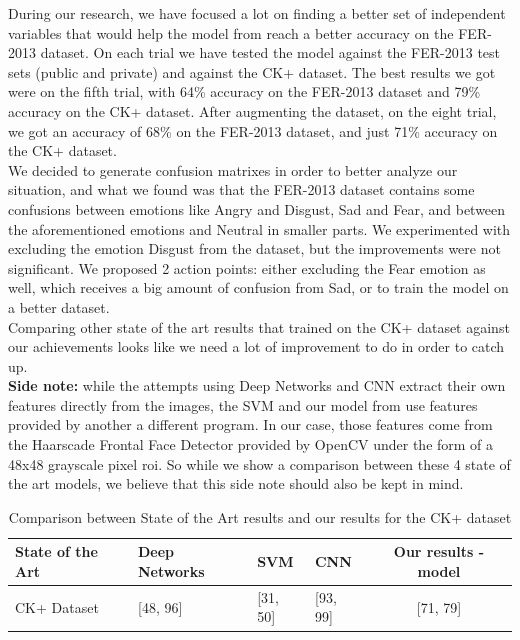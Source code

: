 \documentclass[runningheads,a4paper,11pt]{report}
\begin{document}
During our research, we have focused a lot on finding a better set of independent variables that would help the model from \cite{Arriaga17} reach a better accuracy on the FER-2013 dataset. On each trial we have tested the model against the FER-2013 test sets (public and private) and against the CK+ dataset. The best results we got were on the fifth trial, with 64\% accuracy on the FER-2013 dataset and 79\% accuracy on the CK+ dataset. After augmenting the dataset, on the eight trial, we got an accuracy of 68\% on the FER-2013 dataset, and just 71\% accuracy on the CK+ dataset. \\
We decided to generate confusion matrixes in order to better analyze our situation, and what we found was that the FER-2013 dataset contains some confusions between emotions like Angry and Disgust, Sad and Fear, and between the aforementioned emotions and Neutral in smaller parts. We experimented with excluding the emotion Disgust from the dataset, but the improvements were not significant. We proposed 2 action points: either excluding the Fear emotion as well, which receives a big amount of confusion from Sad, or to train the model on a better dataset.\\
Comparing other state of the art results that trained on the CK+ dataset against our achievements looks like we need a lot of improvement to do in order to catch up.\\
\textbf{Side note:} while the attempts using Deep Networks \cite{Samadiani19} and CNN \cite{Burkert16} extract their own features directly from the images, the SVM \cite{Samadiani19} and our model from \cite{Arriaga17} use features provided by another a different program. In our case, those features come from the Haarscade Frontal Face Detector provided by OpenCV \cite{opencv} under the form of a 48x48 grayscale pixel roi. So while we show a comparison between these 4 state of the art models, we believe that this side note should also be kept in mind.

\begin{table}[htbp]
	\caption{Comparison between State of the Art results and our results for the CK+ dataset}
	\label{state_of_the_art_comparison}
		\begin{center}
			\begin{tabular}{p{100pt}p{100pt}p{60pt}p{60pt}c}
				\textbf{State of the Art}& \textbf{Deep Networks \cite{Samadiani19}}& \textbf{SVM \cite{Samadiani19}}& \textbf{CNN \cite{Burkert16}}& \textbf{Our results - model \cite{Arriaga17}} \\
				\hline\hline
				CK+ Dataset& [48, 96]& [31, 50]& [93, 99]& [71, 79] \\
				\hline
			\end{tabular}
		\end{center}
\end{table}
\end{document}
